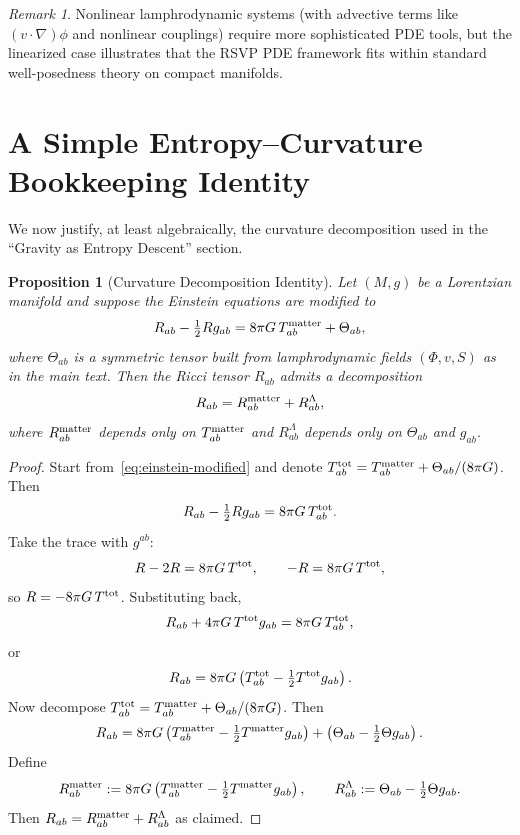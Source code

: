 \documentclass[12pt]{article}
\theoremstyle{plain}
\newtheorem{proposition}[theorem]{Proposition}
\theoremstyle{definition}
\theoremstyle{remark}
\newtheorem{remark}[theorem]{Remark}
\begin{document}
\begin{remark}
Nonlinear lamphrodynamic systems (with advective terms like $(v\cdot\nabla)\phi$
and nonlinear couplings) require more sophisticated PDE tools, but the
linearized case illustrates that the RSVP PDE framework fits within standard
well-posedness theory on compact manifolds.
\end{remark}


\section{A Simple Entropy--Curvature Bookkeeping Identity}

We now justify, at least algebraically, the curvature decomposition used in
the ``Gravity as Entropy Descent'' section.

\begin{proposition}[Curvature Decomposition Identity]
\label{prop:curvature-decomposition}
Let $(M,g)$ be a Lorentzian manifold and suppose the Einstein equations are
modified to
\begin{equation}
    R_{ab} - \tfrac12 R g_{ab} = 8\pi G\, T^{\rm matter}_{ab} + \Theta_{ab},
    \label{eq:einstein-modified}
\end{equation}
where $\Theta_{ab}$ is a symmetric tensor built from lamphrodynamic fields
$(\Phi,v,S)$ as in the main text. Then the Ricci tensor $R_{ab}$ admits a
decomposition
\[
    R_{ab} = R^{\rm matter}_{ab} + R^{\Lambda}_{ab},
\]
where $R^{\rm matter}_{ab}$ depends only on $T^{\rm matter}_{ab}$ and
$R^{\Lambda}_{ab}$ depends only on $\Theta_{ab}$ and $g_{ab}$.
\end{proposition}

\begin{proof}
Start from~\eqref{eq:einstein-modified} and denote $T_{ab}^{\rm tot}
= T^{\rm matter}_{ab} + \Theta_{ab}/(8\pi G)$. Then
\[
    R_{ab} - \tfrac12 R g_{ab} = 8\pi G\, T^{\rm tot}_{ab}.
\]
Take the trace with $g^{ab}$:
\[
    R - 2R = 8\pi G\, T^{\rm tot}, \qquad
    -R = 8\pi G\, T^{\rm tot},
\]
so $R = - 8\pi G\, T^{\rm tot}$. Substituting back,
\[
    R_{ab} + 4\pi G\, T^{\rm tot} g_{ab}
    = 8\pi G\, T^{\rm tot}_{ab},
\]
or
\[
    R_{ab} = 8\pi G\left(
        T^{\rm tot}_{ab} - \tfrac12 T^{\rm tot} g_{ab}
    \right).
\]
Now decompose $T^{\rm tot}_{ab} = T^{\rm matter}_{ab} + \Theta_{ab}/(8\pi G)$.
Then
\[
    R_{ab} = 8\pi G\left(
        T^{\rm matter}_{ab} - \tfrac12 T^{\rm matter} g_{ab}
    \right)
    + \left(
        \Theta_{ab} - \tfrac12 \Theta g_{ab}
    \right).
\]
Define
\[
    R^{\rm matter}_{ab}
    := 8\pi G\left(
        T^{\rm matter}_{ab} - \tfrac12 T^{\rm matter} g_{ab}
    \right),
    \qquad
    R^{\Lambda}_{ab}
    := \Theta_{ab} - \tfrac12 \Theta g_{ab}.
\]
Then $R_{ab} = R^{\rm matter}_{ab} + R^{\Lambda}_{ab}$ as claimed.
\end{proof}
\end{document}

